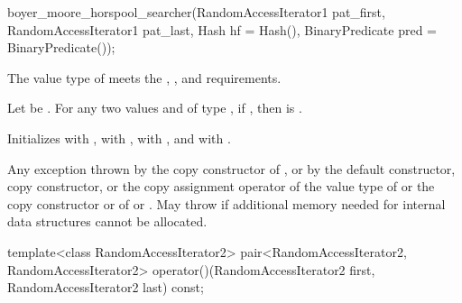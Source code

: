 %
\begin{itemdecl}
boyer_moore_horspool_searcher(RandomAccessIterator1 pat_first,
                              RandomAccessIterator1 pat_last,
                              Hash hf = Hash(),
                              BinaryPredicate pred = BinaryPredicate());
\end{itemdecl}

\begin{itemdescr}
\pnum
\expects
The value type of  meets the ,
, and  requirements.

\pnum
Let  be .
For any two values  and  of type ,
if , then  is .

\pnum
\effects
Initializes
 with ,
 with ,
 with , and
 with .

\pnum
\throws
Any exception thrown by the copy constructor of ,
or by the default constructor, copy constructor, or the copy assignment operator of the value type of 
or the copy constructor or  of  or .
May throw  if additional memory needed for internal data structures cannot be allocated.
\end{itemdescr}

%
\begin{itemdecl}
template<class RandomAccessIterator2>
  pair<RandomAccessIterator2, RandomAccessIterator2>
    operator()(RandomAccessIterator2 first, RandomAccessIterator2 last) const;
\end{itemdecl}

